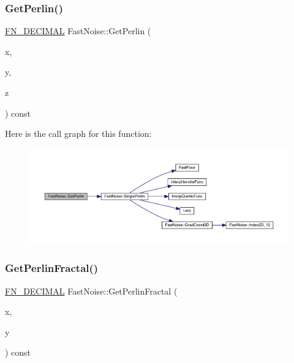 \subsubsection{\texorpdfstring{Get\+Perlin()}{GetPerlin()}\hspace{0.1cm}{\footnotesize\ttfamily [2/2]}}
{\footnotesize\ttfamily \mbox{\hyperlink{_fast_noise_8h_a75a9ef6d2541c4921815b885bfd449c3}{F\+N\+\_\+\+D\+E\+C\+I\+M\+AL}} Fast\+Noise\+::\+Get\+Perlin (\begin{DoxyParamCaption}\item[{\mbox{\hyperlink{_fast_noise_8h_a75a9ef6d2541c4921815b885bfd449c3}{F\+N\+\_\+\+D\+E\+C\+I\+M\+AL}}}]{x,  }\item[{\mbox{\hyperlink{_fast_noise_8h_a75a9ef6d2541c4921815b885bfd449c3}{F\+N\+\_\+\+D\+E\+C\+I\+M\+AL}}}]{y,  }\item[{\mbox{\hyperlink{_fast_noise_8h_a75a9ef6d2541c4921815b885bfd449c3}{F\+N\+\_\+\+D\+E\+C\+I\+M\+AL}}}]{z }\end{DoxyParamCaption}) const}

Here is the call graph for this function\+:
\nopagebreak
\begin{figure}[H]
\begin{center}
\leavevmode
\includegraphics[width=350pt]{d1/dd8/class_fast_noise_ac8379b662e050faf5302026616fc56af_cgraph}
\end{center}
\end{figure}
\mbox{\label{class_fast_noise_adc266f882b7128f39770bc79eae6b872}} 
\subsubsection{\texorpdfstring{Get\+Perlin\+Fractal()}{GetPerlinFractal()}\hspace{0.1cm}{\footnotesize\ttfamily [1/2]}}
{\footnotesize\ttfamily \mbox{\hyperlink{_fast_noise_8h_a75a9ef6d2541c4921815b885bfd449c3}{F\+N\+\_\+\+D\+E\+C\+I\+M\+AL}} Fast\+Noise\+::\+Get\+Perlin\+Fractal (\begin{DoxyParamCaption}\item[{\mbox{\hyperlink{_fast_noise_8h_a75a9ef6d2541c4921815b885bfd449c3}{F\+N\+\_\+\+D\+E\+C\+I\+M\+AL}}}]{x,  }\item[{\mbox{\hyperlink{_fast_noise_8h_a75a9ef6d2541c4921815b885bfd449c3}{F\+N\+\_\+\+D\+E\+C\+I\+M\+AL}}}]{y }\end{DoxyParamCaption}) const}


